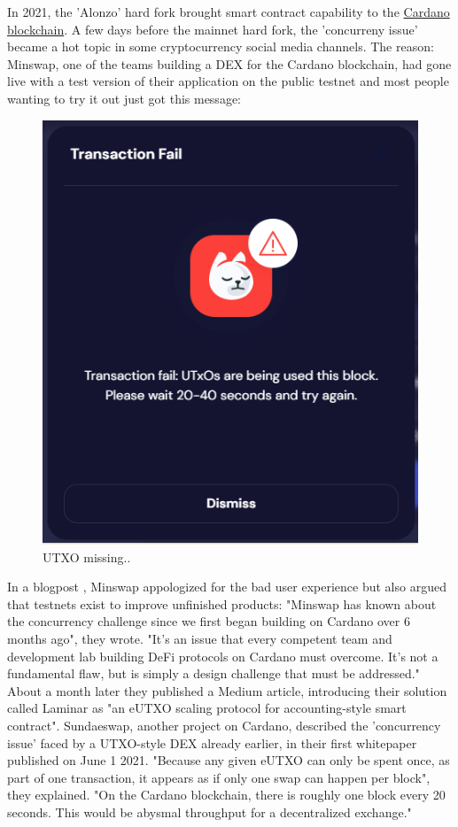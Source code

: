 \documentclass[a4paper,twoside,12pt]{report}
\begin{document}
In 2021, the 'Alonzo' hard fork brought smart contract capability to the \href{https://cardanoscan.io/}{Cardano blockchain}. A few days before the mainnet hard fork, the 'concurreny issue' became a hot topic in some cryptocurrency social media channels. The reason: Minswap, one of the teams building a DEX for the Cardano blockchain, had gone live with a test version of their application on the public testnet and most people wanting to try it out just got this message:
\begin{figure}[H]
\centering
\includegraphics[scale=0.35]{minswap_errormessage}
\caption{UTXO missing..}
\end{figure}
In a blogpost \cite{minswapBlog}, Minswap appologized for the bad user experience but also argued that testnets exist to improve unfinished products: "Minswap has known about the concurrency challenge since we first began building on Cardano over 6 months ago", they wrote. "It’s an issue that every competent team and development lab building DeFi protocols on Cardano must overcome. It’s not a fundamental flaw, but is simply a design challenge that must be addressed." About a month later they published a Medium article, introducing their solution called Laminar \cite{minswapLaminar} as "an eUTXO scaling protocol for accounting-style smart contract". Sundaeswap, another project on Cardano, described the 'concurrency issue' faced by a UTXO-style DEX already earlier, in their first whitepaper \cite{sundaeswapWhitepaper} published on June 1 2021. "Because any given eUTXO can only be spent once, as part of one transaction, it appears as if only one swap can happen per block", they explained. "On the Cardano blockchain, there is roughly one block every 20 seconds. This would be abysmal throughput for a decentralized exchange."
\end{document}
